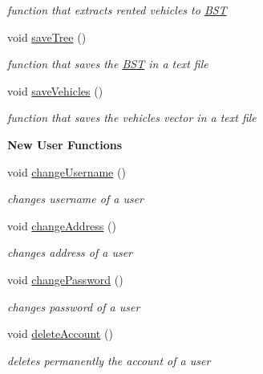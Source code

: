 \begin{Indent}
\begin{DoxyCompactItemize}
\begin{DoxyCompactList}\small\item\em function that extracts rented vehicles to \hyperlink{class_b_s_t}{B\+ST} \end{DoxyCompactList}\item 
void \hyperlink{group___agency_ga33c07400077f762e86f9e5cf1292ef17}{save\+Tree} ()
\begin{DoxyCompactList}\small\item\em function that saves the \hyperlink{class_b_s_t}{B\+ST} in a text file \end{DoxyCompactList}\item 
void \hyperlink{group___agency_ga7d290600e2b02d64db22c5bfcb61c94b}{save\+Vehicles} ()
\begin{DoxyCompactList}\small\item\em function that saves the vehicles vector in a text file \end{DoxyCompactList}\end{DoxyCompactItemize}
\end{Indent}
\begin{Indent}\textbf{ New User Functions}\par
\begin{DoxyCompactItemize}
\item 
void \hyperlink{group___agency_ga8a2b0d746484213d43f722c0a0766a66}{change\+Username} ()
\begin{DoxyCompactList}\small\item\em changes username of a user \end{DoxyCompactList}\item 
void \hyperlink{group___agency_ga9902ae22a9a351479e2b017bc7d32d37}{change\+Address} ()
\begin{DoxyCompactList}\small\item\em changes address of a user \end{DoxyCompactList}\item 
void \hyperlink{group___agency_ga580f891506db1463b17f1076ccadfe4c}{change\+Password} ()
\begin{DoxyCompactList}\small\item\em changes password of a user \end{DoxyCompactList}\item 
void \hyperlink{group___agency_ga90711f8b569ac19ce052b59e79848df5}{delete\+Account} ()
\begin{DoxyCompactList}\small\item\em deletes permanently the account of a user \end{DoxyCompactList}\end{DoxyCompactItemize}
\end{Indent}
